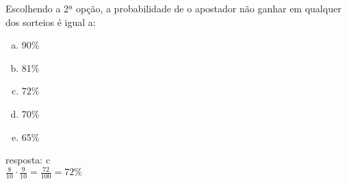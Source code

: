 \begin{ex}
Escolhendo a 2ª opção, a probabilidade de o apostador não ganhar em qualquer dos sorteios é igual a:
   \begin{enumerate}[(a)]
   \item 90\%
   \item 81\%
   \item 72\%
   \item 70\%
   \item 65\%
   \end{enumerate}
    \begin{sol}
     resposta: c \\
     $\frac{8}{10}\cdot\frac{9}{10}=\frac{72}{100}=72\%$
    \end{sol}
\end{ex}
